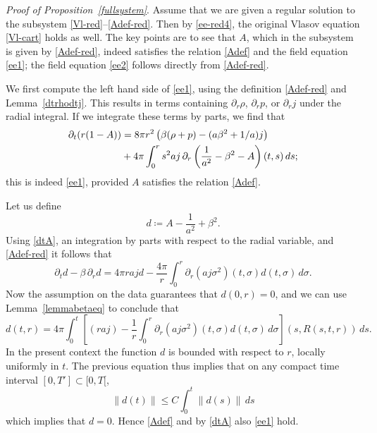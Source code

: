 \documentclass[11pt]{article}
\begin{document}
\noindent
{\em Proof of Proposition~\ref{fullsystem}}.
Assume that we are given a regular solution to the subsystem
\eqref{Vl-red}--\eqref{Adef-red}. Then by \eqref{ee-red4}, the original
Vlasov equation \eqref{Vl-cart} holds as well. The key points are to see that
$A$, which in the subsystem is given by \eqref{Adef-red}, indeed satisfies
the relation \eqref{Adef} and the field equation \eqref{ee1};
the field equation \eqref{ee2} follows directly from \eqref{Adef-red}.

We first compute the left hand side of \eqref{ee1},
using the definition \eqref{Adef-red}
and Lemma~\ref{dtrhodtj}. This results in terms containing $\partial_r \rho$,
$\partial_r p$, or $\partial_r j$ under the radial integral.
If we integrate these terms by parts, we find that
\begin{align}\label{dtA}
  \partial_t (r(1-A))
  &=
  8\pi r^2 \left(\beta (\rho + p) - (a \beta^2 +1/a) j\right)\notag\\
  &
  {} + 4\pi
  \int_0^r s^2 a j \,\partial_r \left(\frac{1}{a^2} -\beta^2 -A\right)(t,s)\, ds;
\end{align}
this is indeed \eqref{ee1}, provided $A$ satisfies the relation \eqref{Adef}.

Let us define
\[
d \coloneqq A - \frac{1}{a^2} + \beta^2.
\]
Using \eqref{dtA}, an integration by parts with respect to the radial variable,
and \eqref{Adef-red} it follows that
\[
\partial_t d - \beta \, \partial_r d = 4 \pi r a j d
- \frac{4\pi}{r}
\int_0^r \partial_r(a j \sigma^2)(t,\sigma) d(t,\sigma) \, d\sigma.
\]
Now the assumption on the data guarantees that $d(0,r)=0$, and we can use
Lemma~\ref{lemmabetaeq} to conclude that
\[
d(t,r)= 4\pi\int_0^t \left[(r a j) - \frac{1}{r}
\int_0^{r} \partial_r(a j \sigma^2)(t,\sigma) d(t,\sigma)\, d\sigma\right]
(s,R(s,t,r))\, ds.
\]
In the present context the function $d$ is bounded with respect to $r$,
locally uniformly in $t$. The previous equation thus implies that on
any compact time interval $[0,T']\subset [0,T[$,
\[
\|d(t)\| \leq C \int_0^t \|d(s)\|\, ds
\]
which implies that $d=0$. Hence \eqref{Adef} and by
\eqref{dtA} also \eqref{ee1} hold.
\end{document}
